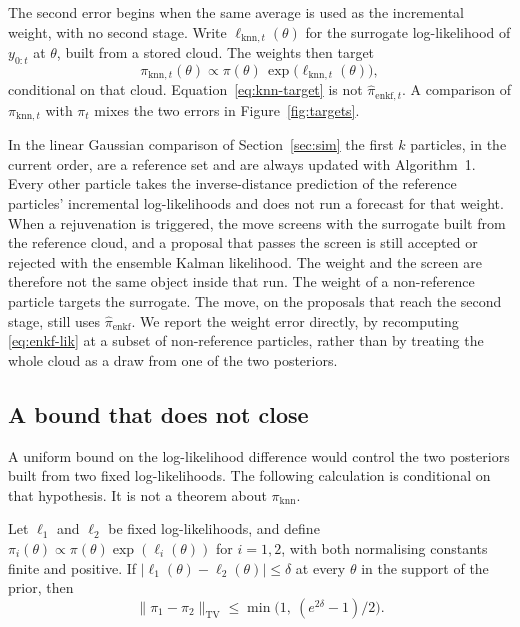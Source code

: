 The second error begins when the same average is used as the incremental weight, with no second stage. Write \(\ell_{\mathrm{knn},t}(\theta)\) for the surrogate log-likelihood of \(y_{0:t}\) at \(\theta\), built from a stored cloud. The weights then target
\begin{equation}
\label{eq:knn-target}
\pi_{\mathrm{knn},t}(\theta)
  \propto \pi(\theta)\, \exp\bigl(\ell_{\mathrm{knn},t}(\theta)\bigr),
\end{equation}
conditional on that cloud. Equation~\eqref{eq:knn-target} is not \(\hat{\pi}_{\mathrm{enkf},t}\). A comparison of \(\pi_{\mathrm{knn},t}\) with \(\pi_t\) mixes the two errors in Figure~\ref{fig:targets}.

In the linear Gaussian comparison of Section~\ref{sec:sim} the first \(k\) particles, in the current order, are a reference set and are always updated with Algorithm~1. Every other particle takes the inverse-distance prediction of the reference particles' incremental log-likelihoods and does not run a forecast for that weight. When a rejuvenation is triggered, the move screens with the surrogate built from the reference cloud, and a proposal that passes the screen is still accepted or rejected with the ensemble Kalman likelihood. The weight and the screen are therefore not the same object inside that run. The weight of a non-reference particle targets the surrogate. The move, on the proposals that reach the second stage, still uses \(\hat{\pi}_{\mathrm{enkf}}\). We report the weight error directly, by recomputing \eqref{eq:enkf-lik} at a subset of non-reference particles, rather than by treating the whole cloud as a draw from one of the two posteriors.

\subsection{A bound that does not close}
\label{sec:bound}

A uniform bound on the log-likelihood difference would control the two posteriors built from two fixed log-likelihoods. The following calculation is conditional on that hypothesis. It is not a theorem about \(\pi_{\mathrm{knn}}\).

\begin{lemma}
\label{lem:tv}
Let \(\ell_1\) and \(\ell_2\) be fixed log-likelihoods, and define \(\pi_i(\theta) \propto \pi(\theta) \exp(\ell_i(\theta))\) for \(i = 1, 2\), with both normalising constants finite and positive. If \(|\ell_1(\theta) - \ell_2(\theta)| \le \delta\) at every \(\theta\) in the support of the prior, then
\begin{equation}
\label{eq:tv}
\|\pi_1 - \pi_2\|_{\mathrm{TV}}
  \le \min\bigl(1,\ (e^{2\delta}-1)/2\bigr).
\end{equation}
\end{lemma}

